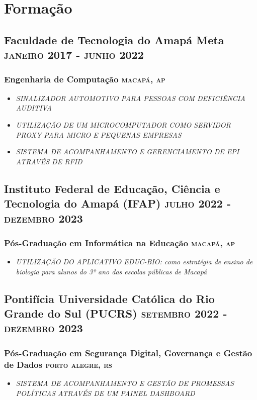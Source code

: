 \documentclass{article}
\newcommand{\rside}[1]{\hfill \normalfont\scshape\MakeLowercase{#1}}
\begin{document}
\section{\faGraduationCap\enspace Formação}
\subsection{Faculdade de Tecnologia do Amapá Meta  \rside{Janeiro 2017 - Junho 2022}}
\subsubsection{Engenharia de Computação \rside{Macapá, AP}}
\begin{itemize}
  \item \textit{SINALIZADOR AUTOMOTIVO PARA PESSOAS COM DEFICIÊNCIA AUDITIVA}
  \item \textit{UTILIZAÇÃO DE UM MICROCOMPUTADOR COMO SERVIDOR PROXY PARA MICRO E PEQUENAS EMPRESAS}
  \item \textit{SISTEMA DE ACOMPANHAMENTO E GERENCIAMENTO DE EPI ATRAVÉS DE RFID}
\end{itemize}
\subsection{Instituto Federal de Educação, Ciência e Tecnologia do Amapá (IFAP) \rside{Julho 2022 - Dezembro 2023}}
\subsubsection{Pós-Graduação em Informática na Educação \rside{Macapá, AP}}
\begin{itemize}
  \item \textit{UTILIZAÇÃO DO APLICATIVO EDUC-BIO: como estratégia de ensino de biologia para alunos do 3º ano das escolas públicas de Macapá}
\end{itemize}
\subsection{Pontifícia Universidade Católica do Rio Grande do Sul (PUCRS) \rside{Setembro 2022 - Dezembro 2023}}
\subsubsection{Pós-Graduação em Segurança Digital, Governança e Gestão de Dados \rside{Porto Alegre, RS}}
\begin{itemize}
  \item \textit{SISTEMA DE ACOMPANHAMENTO E GESTÃO DE PROMESSAS POLÍTICAS ATRAVÉS DE UM PAINEL DASHBOARD}
\end{itemize}
\end{document}
